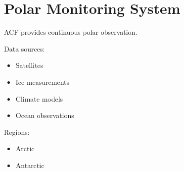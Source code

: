 \section{Polar Monitoring System}


ACF provides continuous polar observation.



Data sources:


\begin{itemize}

\item Satellites

\item Ice measurements

\item Climate models

\item Ocean observations

\end{itemize}



Regions:


\begin{itemize}

\item Arctic

\item Antarctic

\end{itemize}
